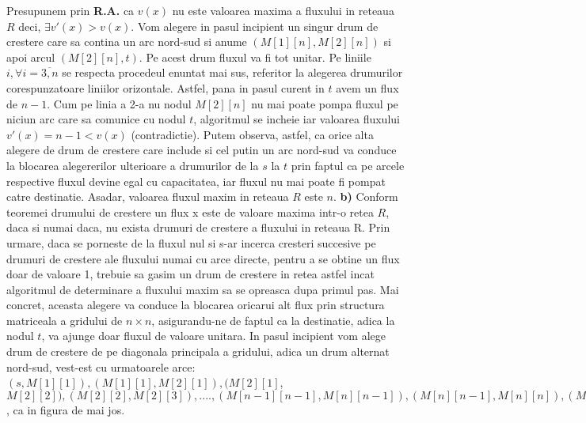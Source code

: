 \documentclass{article}
\begin{document}
Presupunem prin \textbf{R.A.} ca $v(x)$ nu este valoarea maxima a fluxului in reteaua $R$ deci, $\exists v'(x)>v(x)$.
Vom alegere in pasul incipient un singur drum de crestere care sa contina un arc nord-sud si anume $(M[1][n], M[2][n])$ si apoi arcul $(M[2][n], t)$. Pe acest drum fluxul va fi tot unitar. Pe liniile $i, \forall i=\overline{3,n}$ se respecta procedeul enuntat mai sus, referitor la alegerea drumurilor corespunzatoare liniilor orizontale. Astfel, pana in pasul curent in $t$ avem un flux de $n-1$. Cum pe linia a 2-a nu nodul $M[2][n]$ nu mai poate pompa fluxul pe niciun arc care sa comunice cu nodul $t$, algoritmul se incheie iar valoarea fluxului $v'(x)=n-1<v(x)$ (contradictie).
\newline
\newline
Putem observa, astfel, ca orice alta alegere de drum de crestere care include si cel putin  un arc nord-sud va conduce la blocarea alegererilor ulterioare a drumurilor de la $s$ la $t$ prin faptul ca pe arcele respective fluxul devine egal cu capacitatea, iar fluxul nu mai poate fi pompat catre destinatie.
\newline
\newline
Asadar, valoarea fluxul maxim in reteaua $R$ este $n$.
\newline
\newline
\newline
\newline
\textbf{b)}
Conform teoremei drumului de crestere un flux x este de valoare maxima intr-o retea $R$, daca si numai daca, nu exista drumuri de crestere a fluxului in reteaua R. Prin urmare, daca se porneste de la fluxul nul si s-ar incerca cresteri succesive pe drumuri de crestere ale fluxului numai cu arce directe, pentru a se obtine un flux doar de valoare 1,  trebuie sa gasim un drum de crestere in retea astfel incat algoritmul de determinare a fluxului maxim sa se opreasca dupa primul pas. 
\newline
\newline
Mai concret, aceasta alegere va conduce la blocarea oricarui alt flux prin structura matriceala a gridului de $n\times n $, asigurandu-ne de faptul ca la destinatie, adica la nodul $t$, va ajunge doar fluxul de valoare unitara.
In pasul incipient vom alege drum de crestere de pe diagonala principala a gridului, adica un drum alternat nord-sud, vest-est cu urmatoarele arce: $(s,M[1][1]),(M[1][1],M[2][1]), (M[2][1]$,
\
$M[2][2]),(M[2][2],M[2][3]),....,(M[n-1][n-1],M[n][n-1]), (M[n][n-1],M[n][n]), (M[n][n],t)$, ca in figura de mai jos. 
\
\newline
\end{document}
